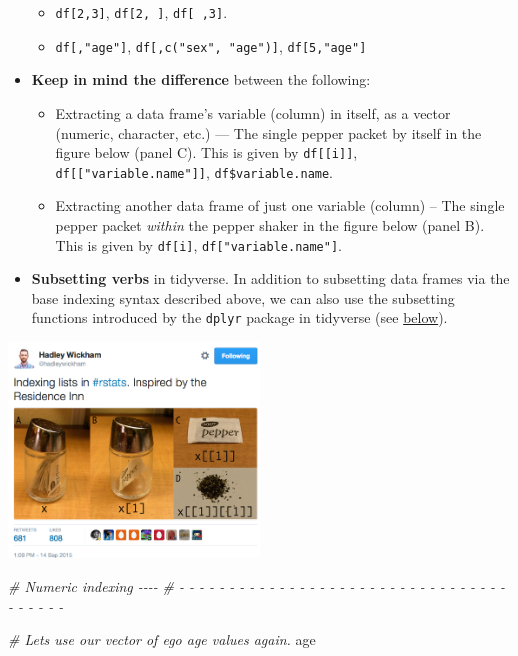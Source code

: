 \documentclass[
]{book}
\newenvironment{Shaded}{\begin{snugshade}}{\end{snugshade}}
\newcommand{\CommentTok}[1]{\textcolor[rgb]{0.56,0.35,0.01}{\textit{#1}}}
\newcommand{\NormalTok}[1]{#1}
\providecommand{\tightlist}{%
  \setlength{\itemsep}{0pt}\setlength{\parskip}{0pt}}
\begin{document}
\begin{itemize}
  \begin{itemize}
  \tightlist
  \item
    \texttt{df{[}2,3{]}}, \texttt{df{[}2,\ {]}}, \texttt{df{[}\ ,3{]}}.
  \item
    \texttt{df{[},"age"{]}}, \texttt{df{[},c("sex",\ "age"){]}}, \texttt{df{[}5,"age"{]}}
  \end{itemize}
\item
  \textbf{Keep in mind the difference} between the following:

  \begin{itemize}
  \tightlist
  \item
    Extracting a data frame's variable (column) in itself, as a vector (numeric, character, etc.) --- The single pepper packet by itself in the figure below (panel C). This is given by \texttt{df{[}{[}i{]}{]}}, \texttt{df{[}{[}"variable.name"{]}{]}}, \texttt{df\$variable.name}.
  \item
    Extracting another data frame of just one variable (column) -- The single pepper packet \emph{within} the pepper shaker in the figure below (panel B). This is given by \texttt{df{[}i{]}}, \texttt{df{[}"variable.name"{]}}.
  \end{itemize}
\item
  \textbf{Subsetting verbs} in tidyverse. In addition to subsetting data frames via the base indexing syntax described above, we can also use the subsetting functions introduced by the \texttt{dplyr} package in tidyverse (see \protect\hyperlink{the-tidyverse-syntax}{below}).
\end{itemize}

\href{https://twitter.com/hadleywickham/status/643381054758363136?lang=en}{\includegraphics[width=0.5\textwidth,height=\textheight]{./Figures/wickham_indexing_tweet.png}}

\begin{Shaded}
\begin{Highlighting}[]
\CommentTok{\# Numeric indexing                                                          {-}{-}{-}{-}}
\CommentTok{\# {-} {-} {-} {-} {-} {-} {-} {-} {-} {-} {-} {-} {-} {-} {-} {-} {-} {-} {-} {-} {-} {-} {-} {-} {-} {-} {-} {-} {-} {-} {-} {-} {-} {-} {-} {-} {-} {-} {-} }

\CommentTok{\# Let\textquotesingle{}s use our vector of ego age values again.}
\NormalTok{age}
\end{Highlighting}
\end{Shaded}
\end{document}
